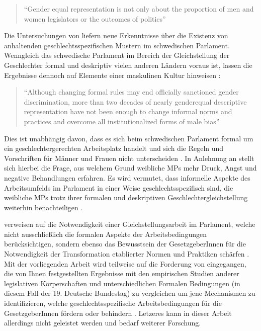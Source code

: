 \documentclass[12pt, 
    twoside=false, 
    bibliography=totoc, 
    numbers=endperiod, 
    headings=normal, 
    toc=chapterentrydotfill
    ]{scrbook}
\begin{document}
 \begin{quote}
 \enquote{Gender equal representation is not only about the proportion of men and women legislators or the outcomes of politics}\parencite[197]{erikson_2018}
 \end{quote}
 
Die Untersuchungen von \textcite{erikson_2018} liefern neue Erkenntnisse über die Existenz von anhaltenden geschlechtsspezifischen Mustern im schwedischen Parlament. Wenngleich das schwedische Parlament im Bereich der Gleichstellung der Geschlechter formal und deskriptiv vielen anderen Ländern voraus ist, lassen die Ergebnisse dennoch auf Elemente einer maskulinen Kultur hinweisen \parencite[211]{erikson_2018}:
\begin{quote}
\enquote{Although changing formal rules
may end officially sanctioned gender discrimination, more than two decades of nearly genderequal
descriptive representation have not been enough to change informal norms and practices and
overcome all institutionalized forms of male bias} \parencite[211]{erikson_2018}
\end{quote}

 Dies ist unabhängig davon, dass es sich beim schwedischen Parlament formal um ein geschlechtergerechten Arbeitsplatz handelt und sich die Regeln und Vorschriften für Männer und Frauen nicht unterscheiden \parencite[211]{erikson_2018}. In Anlehnung an \textcite{erikson_2018} stellt sich hierbei die Frage, aus welchem Grund weibliche MPs mehr Druck, Angst und negative Behandlungen erfahren. Es wird vermutet, dass informelle Aspekte des Arbeitsumfelds im Parlament in einer Weise geschlechtsspezifisch sind, die weibliche MPs trotz ihrer formalen und deskriptiven Geschlechtergleichstellung weiterhin benachteiligen \parencite[210]{erikson_2018}.

\textcite{erikson_2018} verweisen auf die Notwendigkeit einer Gleichstellungsarbeit im Parlament, welche nicht ausschließlich die formalen Aspekte der Arbeitsbedingungen berücksichtigen, sondern ebenso das Bewusstsein der GesetzgeberInnen für die Notwendigkeit der Transformation etablierter Normen und Praktiken schärfen \parencite[211]{erikson_2018}.
Mit der vorliegenden Arbeit wird teilweise auf die Forderung von\textcite{erikson_2018} eingegangen, die von Ihnen festgestellten Ergebnisse mit den empirischen Studien anderer legislativen Körperschaften und unterschiedlichen Formalen Bedingungen (in diesem Fall der 19. Deutsche Bundestag) zu vergleichen um jene Mechanismen zu identifizieren, welche geschlechtsspezifische Arbeitsbedingungen für die GesetzgeberInnen fördern oder behindern \parencite[211]{erikson_2018}. Letzeres kann in dieser Arbeit allerdings nicht geleistet werden und bedarf weiterer Forschung. 
\end{document}

